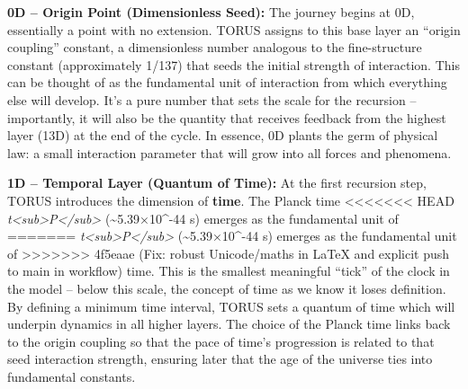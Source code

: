 \documentclass[]{article}
\begin{document}
\textbf{0D -- Origin Point (Dimensionless Seed):} The journey begins at
0D, essentially a point with no extension. TORUS assigns to this base
layer an ``origin coupling'' constant, a dimensionless number analogous
to the fine-structure constant (approximately 1/137) that seeds the
initial strength of interaction. This can be thought of as the
fundamental unit of interaction from which everything else will develop.
It's a pure number that sets the scale for the recursion -- importantly,
it will also be the quantity that receives feedback from the highest
layer (13D) at the end of the cycle. In essence, 0D plants the germ of
physical law: a small interaction parameter that will grow into all
forces and phenomena.

\textbf{1D -- Temporal Layer (Quantum of Time):} At the first recursion
step, TORUS introduces the dimension of \textbf{time}. The Planck time
<<<<<<< HEAD
\emph{t\textless sub\textgreater P\textless/sub\textgreater{}}
(\textasciitilde5.39×10\^{}-44 s) emerges as the fundamental unit of
=======
\emph{t\textless{}sub\textgreater{}P\textless{}/sub\textgreater{}}
(\textasciitilde{}5.39×10\^{}-44 s) emerges as the fundamental unit of
>>>>>>> 4f5eaae (Fix: robust Unicode/maths in LaTeX and explicit push to main in workflow)
time. This is the smallest meaningful ``tick'' of the clock in the model
-- below this scale, the concept of time as we know it loses definition.
By defining a minimum time interval, TORUS sets a quantum of time which
will underpin dynamics in all higher layers. The choice of the Planck
time links back to the origin coupling so that the pace of time's
progression is related to that seed interaction strength, ensuring later
that the age of the universe ties into fundamental constants.
\end{document}
